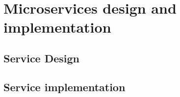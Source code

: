 \chapter{Microservices design and implementation}

\section{Service Design}

\section{Service implementation}

\FloatBarrier
\newpage